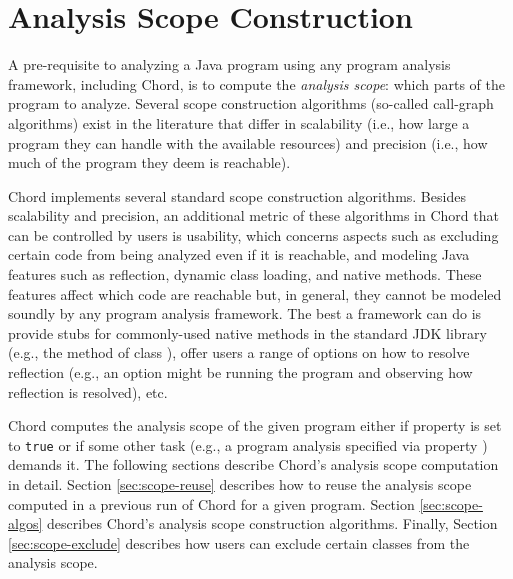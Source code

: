 \chapter{Analysis Scope Construction}
\label{chap:scope}

A pre-requisite to analyzing a Java program using any program analysis framework,
including Chord, is to compute the {\it analysis scope}: which parts of the
program to analyze.  Several scope construction algorithms (so-called
call-graph algorithms) exist in the literature that differ in scalability (i.e.,
how large a program they can handle with the available resources) and precision (i.e., 
how much of the program they deem is reachable).

Chord implements several standard scope construction algorithms.  Besides scalability and precision,
an additional metric of these algorithms in Chord that can be controlled by users is usability,
which concerns aspects such as excluding certain code from being analyzed even if it
is reachable, and modeling Java features such as reflection, dynamic class loading, and native methods.
These features affect which code are
reachable but, in general, they cannot be modeled soundly by any program analysis framework.  The best
a framework can do is
 provide stubs for commonly-used native methods in the standard JDK library (e.g., the 
method of class ), 
offer users a range of options on how to resolve reflection (e.g.,
an option might be running the program and observing how reflection is resolved), etc.

Chord computes the analysis scope of the given
program either if property  is set to {\tt true} or if some other task
(e.g., a program analysis specified via property ) demands it.
The following sections describe Chord's analysis scope 
computation in detail.  Section \ref{sec:scope-reuse} describes how to reuse the analysis scope
computed in a previous run of Chord for a given program.  Section \ref{sec:scope-algos} describes
Chord's analysis scope construction algorithms.  Finally, Section \ref{sec:scope-exclude} describes how users
can exclude certain classes from the analysis scope.

